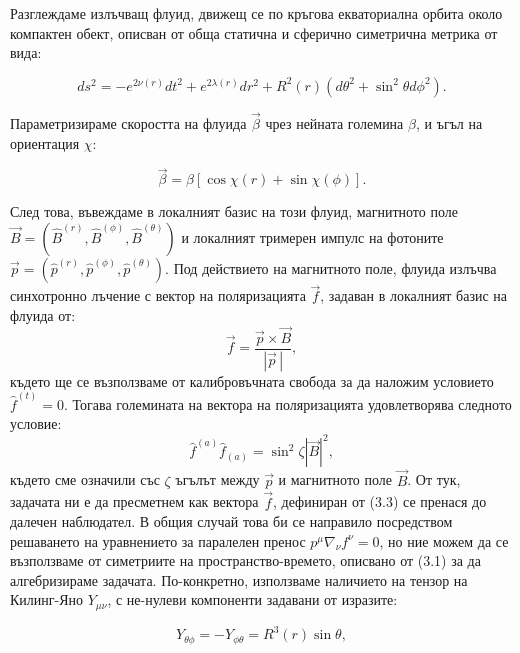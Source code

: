 \documentclass[12pt]{article}
\numberwithin{equation}{section}
\numberwithin{figure}{section}
\begin{document}
	Разглеждаме излъчващ флуид, движещ се по кръгова екваториална орбита около компактен обект, описван от обща статична и сферично симетрична метрика от вида:
	
	\begin{equation}
		ds^2 = - e^{2\nu(r)}dt^2 + e^{2\lambda(r)}dr^2 + R^2(r)\left(d\theta^2 + \sin^2\theta d\phi^2\right).
	\end{equation}
	
	Параметризираме скоростта на флуида $\vec{\beta}$ чрез нейната големина $\beta$, и ъгъл на ориентация $\chi$:
	
	\begin{equation}
		\vec{\beta} = \beta\left[\cos\chi (r) + \sin\chi (\phi)\right].
	\end{equation}
	
	След това, въвеждаме в локалният базис на този флуид, магнитното поле $\vec{B} = (\hat{B}^{(r)},\hat{B}^{(\phi)},\hat{B}^{(\theta)})$ и локалният тримерен импулс на фотоните $\vec{p} = \left(\hat{p}^{(r)},\hat{p}^{(\phi)},\hat{p}^{(\theta)}\right)$. Под действието на магнитното поле, флуида излъчва синхотронно лъчение с вектор на поляризацията $\vec{f}$, задаван в локалният базис на флуида от:
	\begin{equation}
		\vec{f} = \frac{\vec{p}\times\vec{B}}{|\vec{p}\,|},
	\end{equation}
	където ще се възползваме от калибровъчната свобода за да наложим условието $\hat{f}^{(t)} = 0$. Тогава големината на вектора на поляризацията удовлетворява следното условие:
	\begin{equation}
		\hat{f}^{(a)}\hat{f}_{(a)} = \sin^2\zeta|\vec{B}|^2,
	\end{equation}
	където сме означили със $\zeta$ ъгълът между $\vec{p}$ и магнитното поле $\vec{B}$. От тук, задачата ни е да пресметнем как вектора $\vec{f}$, дефиниран от (3.3) се пренася до далечен наблюдател. В общия случай това би се направило посредством решаването на уравнението за паралелен пренос $p^\mu\nabla_\nu f^\nu =0$, но ние можем да се възползваме от симетриите на пространство-времето, описвано от (3.1) за да алгебризираме задачата. По-конкретно, използваме наличието на тензор на Килинг-Яно $Y_{\mu\nu}$, с не-нулеви компоненти задавани от изразите:
	
	\begin{equation}
		Y_{\theta\phi} = -Y_{\phi\theta} = R^3(r)\sin\theta,
	\end{equation}
	
\end{document}
